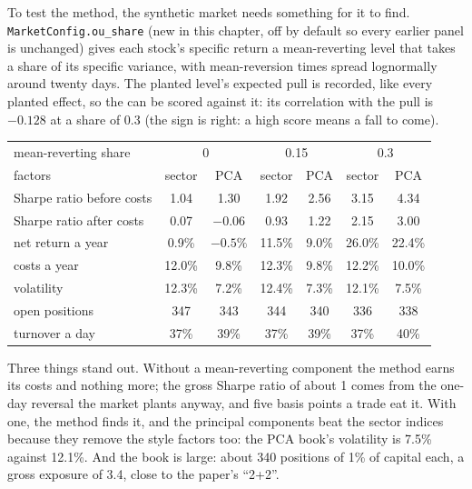 To test the method, the synthetic market needs something for it to find. \texttt{MarketConfig.ou\_share} (new in this chapter, off by default so every
earlier panel is unchanged) gives each stock's specific return a mean-reverting level that takes a share of its specific variance, with mean-reversion times
spread lognormally around twenty days. The planted level's expected pull is recorded, like every planted effect, so the  can be scored against it: its
correlation with the pull is $-0.128$ at a share of 0.3 (the sign is right: a high score means a fall to come).

\begin{center}
\small
\begin{tabular}{@{}lcccccc@{}}
\toprule
mean-reverting share & \multicolumn{2}{c}{0} & \multicolumn{2}{c}{0.15} & \multicolumn{2}{c}{0.3}\\
factors & sector & PCA & sector & PCA & sector & PCA\\
\midrule
Sharpe ratio before costs & 1.04 & 1.30 & 1.92 & 2.56 & 3.15 & 4.34\\
Sharpe ratio after costs & 0.07 & $-0.06$ & 0.93 & 1.22 & 2.15 & 3.00\\
net return a year & 0.9\% & $-0.5\%$ & 11.5\% & 9.0\% & 26.0\% & 22.4\%\\
costs a year & 12.0\% & 9.8\% & 12.3\% & 9.8\% & 12.2\% & 10.0\%\\
volatility & 12.3\% & 7.2\% & 12.4\% & 7.3\% & 12.1\% & 7.5\%\\
open positions & 347 & 343 & 344 & 340 & 336 & 338\\
turnover a day & 37\% & 39\% & 37\% & 39\% & 37\% & 40\%\\
\bottomrule
\end{tabular}
\end{center}

Three things stand out. Without a mean-reverting component the method earns its costs and nothing more; the gross Sharpe ratio of about 1 comes from the
one-day reversal the market plants anyway, and five basis points a trade eat it. With one, the method finds it, and the principal components beat the sector
indices because they remove the style factors too: the PCA book's volatility is 7.5\% against 12.1\%. And the book is large: about 340 positions of 1\% of
capital each, a gross exposure of 3.4, close to the paper's ``2+2''.

